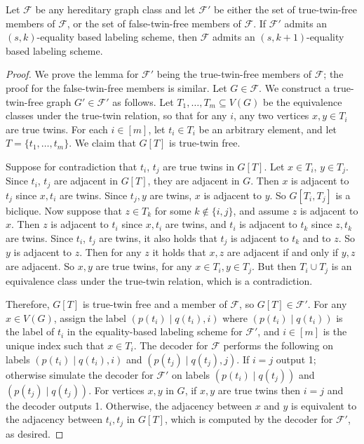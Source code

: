 \documentclass{theoretics}
\newcommand\eqLabelSep{\mathbin|}
\newcommand{\cF}{\ensuremath{\mathcal{F}}}
\begin{document}
\begin{lemma}
\label{lemma:true-twin reduction}
Let $\cF$ be any hereditary graph class and let $\cF'$ be either the set of true-twin-free members
of $\cF$, or the set of false-twin-free members of $\cF$. If $\cF'$ admits an $(s,k)$-equality based
labeling scheme, then $\cF$ admits an $(s,k+1)$-equality based labeling scheme.
\end{lemma}
\begin{proof}
We prove the lemma for $\cF'$ being the true-twin-free members of $\cF$; the proof for the
false-twin-free members is similar.  Let $G \in \cF$. We construct a true-twin-free graph $G' \in
\cF'$ as follows. Let $T_1, \dotsc, T_m \subseteq V(G)$ be the equivalence classes under the
true-twin relation, so that for any $i$, any two vertices $x,y \in T_i$ are true twins. For each $i \in
[m]$, let $t_i \in T_i$ be an arbitrary element, and let $T = \{t_1, \dotsc, t_m\}$. We claim that
$G[T]$ is true-twin free.

Suppose for contradiction that $t_i$, $t_j$ are true twins in $G[T]$. Let $x \in T_i$, $y \in T_j$.
Since $t_i$, $t_j$ are adjacent in $G[T]$, they are adjacent in $G$. Then $x$ is adjacent to $t_j$
since $x,t_i$ are twins. Since $t_j,y$ are twins, $x$ is adjacent to $y$. So $G[T_i,T_j]$ is a
biclique. Now suppose that $z \in T_k$ for some $k \notin \{i,j\}$, and assume $z$ is adjacent to
$x$. Then $z$ is adjacent to $t_i$ since $x, t_i$ are twins, and $t_i$ is adjacent to $t_k$ since
$z, t_k$ are twins. Since $t_i$, $t_j$ are twins, it also holds that $t_j$ is adjacent to $t_k$ and
to $z$. So $y$ is adjacent to $z$. Then for any $z$ it holds that $x,z$ are adjacent if and only if
$y,z$ are adjacent. So $x,y$ are true twins, for any $x \in T_i, y \in T_j$. But then $T_i \cup T_j$
is an equivalence class under the true-twin relation, which is a contradiction.

Therefore, $G[T]$ is true-twin free and a member of $\cF$, so $G[T] \in \cF'$. For any $x \in V(G)$,
assign the label $( p(t_i) \eqLabelSep q(t_i), i )$ where $( p(t_i) \eqLabelSep q(t_i) )$ is the label of $t_i$ in
the equality-based labeling scheme for $\cF'$, and $i \in [m]$ is the unique index such that $x \in
T_i$. The decoder for $\cF$ performs the following on labels $( p(t_i) \eqLabelSep q(t_i), i)$ and
$( p(t_j) \eqLabelSep q(t_j), j)$. If $i = j$ output 1; otherwise simulate the decoder for $\cF'$ on
labels $(p(t_i) \eqLabelSep q(t_j))$ and $(p(t_j) \eqLabelSep q(t_j) )$. For vertices $x,y$ in $G$, if $x,y$ are
true twins then $i=j$ and the decoder outputs 1. Otherwise, the adjacency between $x$ and $y$ is
equivalent to the adjacency between $t_i,t_j$ in $G[T]$, which is computed by the decoder for
$\cF'$, as desired.
\end{proof}
\end{document}
